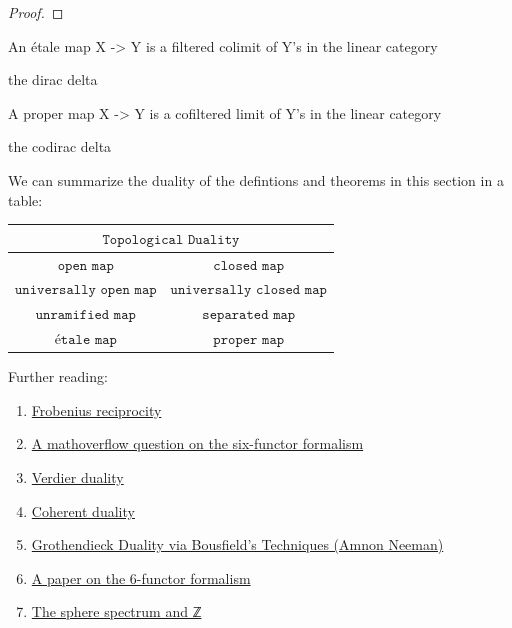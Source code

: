 \documentclass{book}
\theoremstyle{definition}
\begin{document}
\begin{proof}

\end{proof}

\begin{proposition}
An étale map X -> Y is a filtered colimit of Y's in the linear category
\end{proposition}

\begin{corollary}
the dirac delta
\end{corollary}

\begin{proposition}
A proper map X -> Y is a cofiltered limit of Y's in the linear category
\end{proposition}

\begin{corollary}
the codirac delta
\end{corollary}
\fi

We can summarize the duality of the defintions and theorems in this section in a table:\\
\begin{center}
\begin{tabular}{ c c }
\multicolumn{2}{c}{$\texttt{Topological \ Duality}$}\\
\hline
$\texttt{open\ map}$ & $\texttt{closed\ map}$  \\ 
$\texttt{universally\ open\ map}$ & $\texttt{universally\ closed\ map}$\\
$\texttt{unramified\ map}$ & $\texttt{separated\ map}$ \\  
$\texttt{étale\ map}$ & $\texttt{proper\ map}$  \\
\hline
\end{tabular}
\end{center}

Further reading:
\begin{enumerate}
\item \href{https://ncatlab.org/nlab/show/Frobenius+reciprocity}{Frobenius reciprocity}
\item \href{https://mathoverflow.net/questions/404706/how-duality-follows-from-a-six-functor-formalism}{A mathoverflow question on the six-functor formalism}
\item \href{https://en.wikipedia.org/wiki/Verdier_duality}{Verdier duality}
\item \href{https://en.wikipedia.org/wiki/Coherent_duality}{Coherent duality}
\item \href{https://www.ams.org/journals/jams/1996-9-01/S0894-0347-96-00174-9/S0894-0347-96-00174-9.pdf}{Grothendieck Duality via Bousfield's Techniques (Amnon Neeman)}
\item \href{https://arxiv.org/pdf/1501.01999.pdf}{A paper on the 6-functor formalism}
\item \href{https://mathoverflow.net/questions/433863/why-the-sphere-spectrum-is-more-correct-than-mathbbz}{The sphere spectrum and ℤ}
\end{enumerate}
\end{document}
